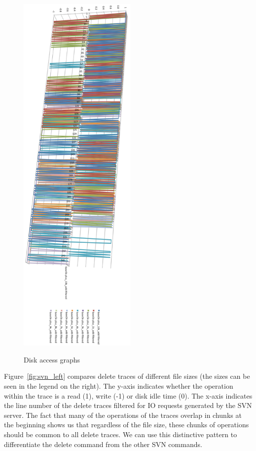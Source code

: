 \documentclass[11pt, oneside]{article}
\newcommand{\fref}[1]{Figure~\ref{#1}}
\begin{document}
\begin{figure}[H]
{	    \includegraphics[height=7.2in]{SVN_right.png}
	    \label{fig:svn_right}
	}
	\caption{Disk access graphs}
	\label{fig:svn_graphs}
\end{figure}

\fref{fig:svn_left} compares delete traces of different file sizes (the sizes 
can be seen in the legend on the right).  The y-axis indicates whether the 
operation within the trace is a read (1), write (-1) or disk idle time (0). 
The x-axis indicates the line number of the delete traces filtered for IO 
requests generated by the SVN server. The fact that many of the operations of 
the traces overlap in chunks at the beginning shows us that regardless of the 
file size, these chunks of operations should be common to all delete traces. 
We can use this distinctive pattern to differentiate the delete command from 
the other SVN commands.
\end{document}
